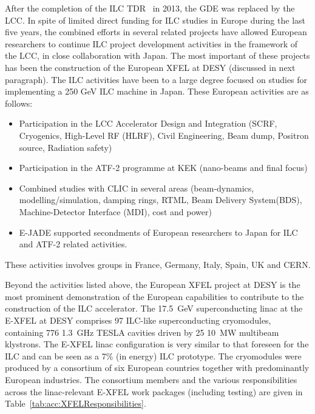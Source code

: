 \documentclass[%
 reprint,
 floatfix,
 amsmath,amssymb,
 aps,
]{revtex4-1}
\begin{document}
After the completion of the ILC TDR~\cite{Adolphsen:2013kya} in 2013, the GDE was replaced by the LCC. In spite of limited direct funding for ILC studies in Europe during the last five years, the combined efforts in several related projects have allowed European researchers to continue ILC project development activities in the framework of the LCC, in close collaboration with Japan. The most important of these projects has been the construction of the European XFEL at DESY (discussed in next paragraph). The ILC activities have been to a large degree focused on studies for implementing a 250 GeV ILC machine in Japan. These European activities are as follows:

\begin{itemize}
\item Participation in the LCC Accelerator Design and Integration (SCRF, Cryogenics, High-Level RF (HLRF), Civil Engineering, Beam dump, Positron source, Radiation safety)
\item Participation in the ATF-2 programme at KEK (nano-beams and final focus)
\item Combined studies with CLIC in several areas (beam-dynamics, modelling/simulation, damping rings, RTML, Beam Delivery System(BDS), Machine-Detector Interface (MDI), cost and power)
\item E-JADE supported secondments of European researchers to Japan for ILC and ATF-2 related activities.
\end{itemize}
These activities involves groups in  France, Germany, Italy, Spain, UK and CERN. 



Beyond the activities listed above, the European XFEL project at DESY is the most prominent demonstration of the European capabilities
to contribute to the construction of the ILC accelerator.
The 17.5~GeV superconducting linac at the E-XFEL at DESY comprises 97 ILC-like superconducting cryomodules, containing 776 1.3~GHz TESLA cavities
driven by 25 10~MW multibeam klystrons. The E-XFEL linac configuration is very similar to that foreseen for the ILC and can be seen as a 7\% (in energy) ILC prototype. The cryomodules were produced by a consortium of six European countries together with predominantly European industries. 
 The consortium members and the various responsibilities across the linac-relevant E-XFEL work packages (including testing) are given in Table~\ref{tab:acc:XFELResponsibilities}.
\end{document}
